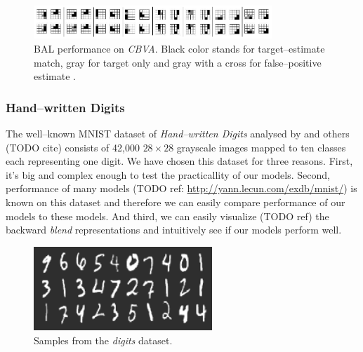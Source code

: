 \begin{figure}[H]
  \centering
  \includegraphics[width=0.8\textwidth]{img/datasets-k3.png} 
  \caption{BAL performance on \emph{CBVA}. Black color stands for target--estimate match, gray for target only and gray with a cross for false--positive estimate \citep{farkas2013bal}.}
  \label{fig:datasets-k3}
\end{figure}

\subsubsection{Hand--written Digits} 
\label{sec:datasets-digits} 

The well--known MNIST dataset of \emph{Hand--written Digits} analysed by \citet{lecun1998gradient} and others (TODO cite) consists of 42,000 $28 \times 28$ grayscale images mapped to ten classes each representing one digit. We have chosen this dataset for three reasons. First, it's big and complex enough to test the practicallity of our models. Second, performance of many models (TODO ref: \url{http://yann.lecun.com/exdb/mnist/}) is known on this dataset and therefore we can easily compare performance of our models to these models. And third, we can easily visualize (TODO ref) the backward \emph{blend} representations and intuitively see if our models perform well. 

\begin{figure}[H]
  \centering
  \includegraphics[width=0.6\textwidth]{img/digits.png} 
  \caption{Samples from the \emph{digits} dataset.}
  \label{fig:datasets-digits}
\end{figure}


